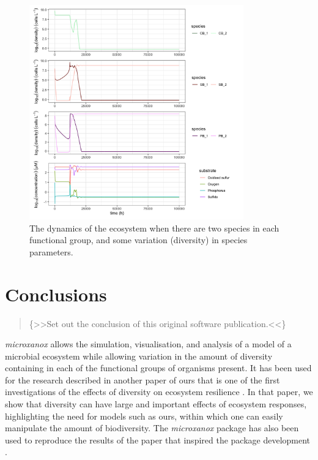 \documentclass[]{elsarticle} %
\begin{document}
\begin{figure}

{\centering \includegraphics[width=350px]{figures/uc3_supplement_5_4} 

}

\caption{The dynamics of the ecosystem when there are two species in each functional group, and some variation (diversity) in species parameters.}\label{fig:uc3}
\end{figure}

\hypertarget{conclusions}{%
\section{Conclusions}\label{conclusions}}

\begin{quote}
\{\textgreater\textgreater Set out the conclusion of this original
software publication.\textless\textless\}
\end{quote}

\emph{microxanox} allows the simulation, visualisation, and analysis of
a model of a microbial ecosystem while allowing variation in the amount
of diversity containing in each of the functional groups of organisms
present. It has been used for the research described in another paper of
ours that is one of the first investigations of the effects of diversity
on ecosystem resilience \citet{Limberger2022}. In that paper, we show
that diversity can have large and important effects of ecosystem
responses, highlighting the need for models such as ours, within which
one can easily manipulate the amount of biodiversity. The
\emph{microxanox} package has also been used to reproduce the results of
the paper that inspired the package development \citet{Bush2017}.
\end{document}
